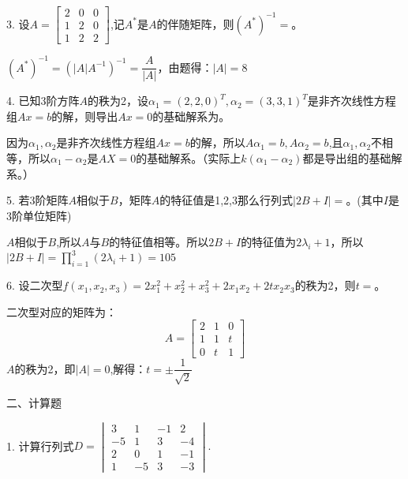\documentclass{article}
\begin{document}
3. 设$
A=
\begin{bmatrix}
  2 & 0 & 0 \\
  1 & 2 & 0 \\
  1 & 2 & 2
\end{bmatrix}
$,记$A^*$是$A$的伴随矩阵，则$(A^{*})^{-1}=$\underline{\hphantom{~~~~~~~~~~}}。

\begin{jie}
$(A^ {*})^{-1}=(|A|A^{-1})^{-1}=\dfrac{A}{|A|}$，由题得：$|A|=8$
\end{jie}

4. 已知3阶方阵$A$的秩为2，设$\alpha_ {1}=(2,2,0)^{T},\alpha_{2}=(3,3,1)^{T}$是非齐次线性方程组$Ax=b$的解，则导出$Ax=0$的基础解系为\underline{\hphantom{~~~~~~~~~~}}。

\begin{jie}
因为$\alpha_ {1},\alpha_{2}$是非齐次线性方程组$Ax=b$的解，所以$A\alpha_1=b,A\alpha_2=b$,且$\alpha_ {1},\alpha_{2}$不相等，所以$\alpha_1-\alpha_2$是$AX=0$的基础解系。（实际上$k(\alpha_1-\alpha_2)$都是导出组的基础解系。）
\end{jie}

5. 若3阶矩阵$A$相似于$B$，矩阵$A$的特征值是1,2,3那么行列式$|2B+I|=$\underline{\hphantom{~~~~~~~~~~}}。(其中$I$是3阶单位矩阵)

\begin{jie}
$A$相似于$B$,所以$A$与$B$的特征值相等。所以$2B+I$的特征值为$2\lambda_i+1$，所以$|2B+I|=\prod\limits_{i=1}^{3}(2\lambda_i+1)=105$
\end{jie}

6. 设二次型$f(x_{1},x_{2},x_{3})=2x_{1}^{2}+x_{2}^{2}+x_{3}^{2}+2x_{1}x_{2}+2tx_{2}x_{3}$的秩为2，则$t=$\underline{\hphantom{~~~~~~~~~~}}。

\begin{jie}
二次型对应的矩阵为：
\begin{equation*}
A=
\begin{bmatrix}
  2 & 1 & 0\\
  1 & 1 & t\\
  0 & t &1
\end{bmatrix}
\end{equation*}
$A$的秩为2，即$|A|=0$,解得：$t=\pm\dfrac{1}{\sqrt{2}}$
\end{jie}

二、计算题

1. 计算行列式$D=
\begin{vmatrix}
  3 & 1 & -1 & 2 \\
  -5 & 1 & 3 & -4 \\
  2 & 0 & 1 & -1\\
   1 & -5 & 3 & -3
\end{vmatrix}
.$
\end{document}
